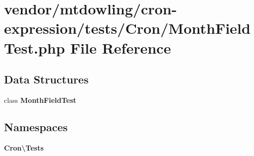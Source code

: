 \section{vendor/mtdowling/cron-\/expression/tests/\+Cron/\+Month\+Field\+Test.php File Reference}
\label{_month_field_test_8php}
\subsection*{Data Structures}
\begin{DoxyCompactItemize}
\item 
class {\bf Month\+Field\+Test}
\end{DoxyCompactItemize}
\subsection*{Namespaces}
\begin{DoxyCompactItemize}
\item 
 {\bf Cron\textbackslash{}\+Tests}
\end{DoxyCompactItemize}
